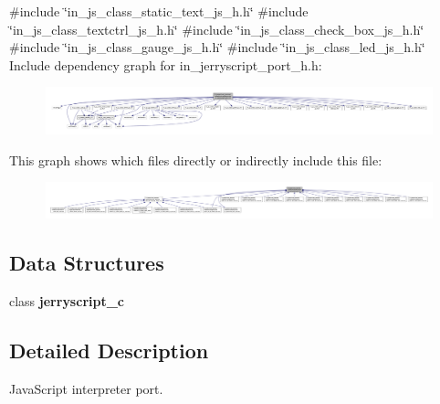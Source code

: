 {\ttfamily \#include \char`\"{}in\+\_\+js\+\_\+class\+\_\+static\+\_\+text\+\_\+js\+\_\+h.\+h\char`\"{}}\newline
{\ttfamily \#include \char`\"{}in\+\_\+js\+\_\+class\+\_\+textctrl\+\_\+js\+\_\+h.\+h\char`\"{}}\newline
{\ttfamily \#include \char`\"{}in\+\_\+js\+\_\+class\+\_\+check\+\_\+box\+\_\+js\+\_\+h.\+h\char`\"{}}\newline
{\ttfamily \#include \char`\"{}in\+\_\+js\+\_\+class\+\_\+gauge\+\_\+js\+\_\+h.\+h\char`\"{}}\newline
{\ttfamily \#include \char`\"{}in\+\_\+js\+\_\+class\+\_\+led\+\_\+js\+\_\+h.\+h\char`\"{}}\newline
Include dependency graph for in\+\_\+jerryscript\+\_\+port\+\_\+h.\+h\+:
\nopagebreak
\begin{figure}[H]
\begin{center}
\leavevmode
\includegraphics[width=350pt]{in__jerryscript__port__h_8h__incl}
\end{center}
\end{figure}
This graph shows which files directly or indirectly include this file\+:
\nopagebreak
\begin{figure}[H]
\begin{center}
\leavevmode
\includegraphics[width=350pt]{in__jerryscript__port__h_8h__dep__incl}
\end{center}
\end{figure}
\subsection*{Data Structures}
\begin{DoxyCompactItemize}
\item 
class \textbf{ jerryscript\+\_\+c}
\end{DoxyCompactItemize}


\subsection{Detailed Description}
Java\+Script interpreter port. 

